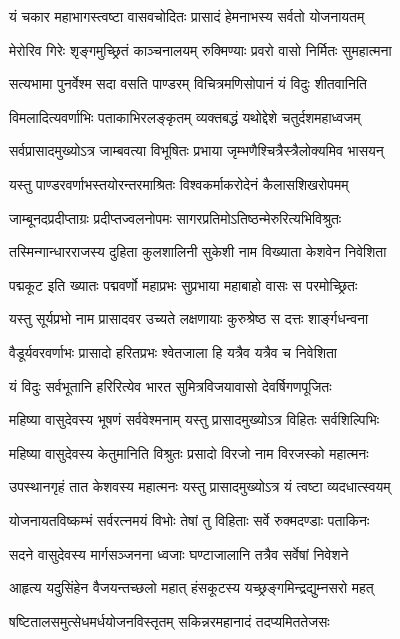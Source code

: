 \twolineshloka
{यं चकार महाभागस्त्वष्टा वासवचोदितः}
{प्रासादं हेमनाभस्य सर्वतो योजनायतम्}


\twolineshloka
{मेरोरिव गिरेः शृङ्गमुच्छ्रितं काञ्चनालयम्}
{रुक्मिण्याः प्रवरो वासो निर्मितः सुमहात्मना}


\twolineshloka
{सत्यभामा पुनर्वेश्म सदा वसति पाण्डरम्}
{विचित्रमणिसोपानं यं विदुः शीतवानिति}


\twolineshloka
{विमलादित्यवर्णाभिः पताकाभिरलङ्कृतम्}
{व्यक्तबद्धं यथोद्देशे चतुर्दशमहाध्वजम्}


\twolineshloka
{सर्वप्रासादमुख्योऽत्र जाम्बवत्या विभूषितः}
{प्रभाया जृम्भणैश्चित्रैस्त्रैलोक्यमिव भासयन्}


\twolineshloka
{यस्तु पाण्डरवर्णाभस्तयोरन्तरमाश्रितः}
{विश्वकर्माकरोदेनं कैलासशिखरोपमम्}


\twolineshloka
{जाम्बूनदप्रदीप्ताग्रः प्रदीप्तज्वलनोपमः}
{सागरप्रतिमोऽतिष्ठन्मेरुरित्यभिविश्रुतः}


\twolineshloka
{तस्मिन्गान्धारराजस्य दुहिता कुलशालिनी}
{सुकेशी नाम विख्याता केशवेन निवेशिता}


\twolineshloka
{पद्मकूट इति ख्यातः पद्मवर्णो महाप्रभः}
{सुप्रभाया महाबाहो वासः स परमोच्छ्रितः}


\twolineshloka
{यस्तु सूर्यप्रभो नाम प्रासादवर उच्यते}
{लक्षणायाः कुरुश्रेष्ठ स दत्तः शार्ङ्गधन्वना}


\twolineshloka
{वैडूर्यवरवर्णाभः प्रासादो हरितप्रभः}
{श्वेतजाला हि यत्रैव यत्रैव च निवेशिता}


\twolineshloka
{यं विदुः सर्वभूतानि हरिरित्येव भारत}
{सुमित्रविजयावासो देवर्षिगणपूजितः}


\twolineshloka
{महिष्या वासुदेवस्य भूषणं सर्ववेश्मनाम्}
{यस्तु प्रासादमुख्योऽत्र विहितः सर्वशिल्पिभिः}


\twolineshloka
{महिष्या वासुदेवस्य केतुमानिति विश्रुतः}
{प्रसादो विरजो नाम विरजस्को महात्मनः}


\twolineshloka
{उपस्थानगृहं तात केशवस्य महात्मनः}
{यस्तु प्रासादमुख्योऽत्र यं त्वष्टा व्यदधात्स्वयम्}


\twolineshloka
{योजनायतविष्कम्भं सर्वरत्नमयं विभोः}
{तेषां तु विहिताः सर्वे रुक्मदण्डाः पताकिनः}


\twolineshloka
{सदने वासुदेवस्य मार्गसञ्जनना ध्वजाः}
{घण्टाजालानि तत्रैव सर्वेषां निवेशने}


\twolineshloka
{आहृत्य यदुसिंहेन वैजयन्तच्छलो महात्}
{हंसकूटस्य यच्छ्रङ्गमिन्द्रद्युम्नसरो महत्}


\twolineshloka
{षष्टितालसमुत्सेधमर्धयोजनविस्तृतम्}
{सकिन्नरमहानादं तदप्यमिततेजसः}


